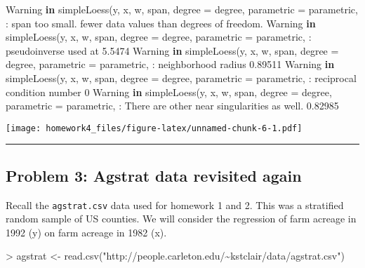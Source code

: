 \documentclass[
]{article}
\newenvironment{Shaded}{\begin{snugshade}}{\end{snugshade}}
\newcommand{\AttributeTok}[1]{\textcolor[rgb]{0.77,0.63,0.00}{#1}}
\newcommand{\ControlFlowTok}[1]{\textcolor[rgb]{0.13,0.29,0.53}{\textbf{#1}}}
\newcommand{\DecValTok}[1]{\textcolor[rgb]{0.00,0.00,0.81}{#1}}
\newcommand{\FloatTok}[1]{\textcolor[rgb]{0.00,0.00,0.81}{#1}}
\newcommand{\FunctionTok}[1]{\textcolor[rgb]{0.00,0.00,0.00}{#1}}
\newcommand{\NormalTok}[1]{#1}
\newcommand{\OtherTok}[1]{\textcolor[rgb]{0.56,0.35,0.01}{#1}}
\newcommand{\SpecialCharTok}[1]{\textcolor[rgb]{0.00,0.00,0.00}{#1}}
\newcommand{\StringTok}[1]{\textcolor[rgb]{0.31,0.60,0.02}{#1}}
\begin{document}
\begin{Shaded}
\begin{Highlighting}[]
\NormalTok{Warning }\ControlFlowTok{in} \FunctionTok{simpleLoess}\NormalTok{(y, x, w, span, }\AttributeTok{degree =}\NormalTok{ degree, }\AttributeTok{parametric =}
\NormalTok{parametric, }\SpecialCharTok{:}\NormalTok{ span too small. fewer data values than degrees of freedom.}
\NormalTok{Warning }\ControlFlowTok{in} \FunctionTok{simpleLoess}\NormalTok{(y, x, w, span, }\AttributeTok{degree =}\NormalTok{ degree, }\AttributeTok{parametric =}
\NormalTok{parametric, }\SpecialCharTok{:}\NormalTok{ pseudoinverse used at }\FloatTok{5.5474}
\NormalTok{Warning }\ControlFlowTok{in} \FunctionTok{simpleLoess}\NormalTok{(y, x, w, span, }\AttributeTok{degree =}\NormalTok{ degree, }\AttributeTok{parametric =}
\NormalTok{parametric, }\SpecialCharTok{:}\NormalTok{ neighborhood radius }\FloatTok{0.89511}
\NormalTok{Warning }\ControlFlowTok{in} \FunctionTok{simpleLoess}\NormalTok{(y, x, w, span, }\AttributeTok{degree =}\NormalTok{ degree, }\AttributeTok{parametric =}
\NormalTok{parametric, }\SpecialCharTok{:}\NormalTok{ reciprocal condition number }\DecValTok{0}
\NormalTok{Warning }\ControlFlowTok{in} \FunctionTok{simpleLoess}\NormalTok{(y, x, w, span, }\AttributeTok{degree =}\NormalTok{ degree, }\AttributeTok{parametric =}
\NormalTok{parametric, }\SpecialCharTok{:}\NormalTok{ There are other near singularities as well. }\FloatTok{0.82985}
\end{Highlighting}
\end{Shaded}

\texttt{[image: homework4\_files/figure-latex/unnamed-chunk-6-1.pdf]}

\begin{center}\rule{0.5\linewidth}{0.5pt}\end{center}

\hypertarget{problem-3-agstrat-data-revisited-again}{%
\subsection{Problem 3: Agstrat data revisited
again}\label{problem-3-agstrat-data-revisited-again}}

Recall the \texttt{agstrat.csv} data used for homework 1 and 2. This was
a stratified random sample of US counties. We will consider the
regression of farm acreage in 1992 (y) on farm acreage in 1982 (x).

\begin{Shaded}
\begin{Highlighting}[]
\SpecialCharTok{\textgreater{}}\NormalTok{ agstrat }\OtherTok{\textless{}{-}} \FunctionTok{read.csv}\NormalTok{(}\StringTok{"http://people.carleton.edu/\textasciitilde{}kstclair/data/agstrat.csv"}\NormalTok{)}
\end{Highlighting}
\end{Shaded}
\end{document}
